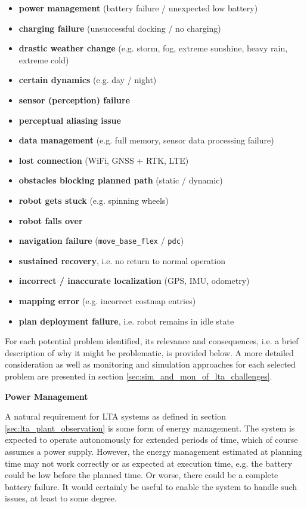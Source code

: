 \documentclass[english, master, utf8]{base/thesis_KBS}
\newcommand{\code}[1]{\colorbox{light-gray}{\texttt{#1}}}
\begin{document}
\begin{itemize}
    \item \textbf{power management} (battery failure / unexpected low battery)
    \item \textbf{charging failure} (unsuccessful docking / no charging)
    \item \textbf{drastic weather change} (e.g. storm, fog, extreme sunshine, heavy rain, extreme cold)
    \item \textbf{certain dynamics} (e.g. day / night)
    \item \textbf{sensor (perception) failure}
    \item \textbf{perceptual aliasing issue}
    \item \textbf{data management} (e.g. full memory, sensor data processing failure)
    \item \textbf{lost connection} (WiFi, GNSS + RTK, LTE)
    \item \textbf{obstacles blocking planned path} (static / dynamic)
    \item \textbf{robot gets stuck} (e.g. spinning wheels)
    \item \textbf{robot falls over}
    \item \textbf{navigation failure} (\code{move\_base\_flex} / \code{pdc})
    \item \textbf{sustained recovery}, i.e. no return to normal operation
    \item \textbf{incorrect / inaccurate localization} (GPS, IMU, odometry)
    \item \textbf{mapping error} (e.g. incorrect costmap entries)
    \item \textbf{plan deployment failure}, i.e. robot remains in idle state
\end{itemize}
For each potential problem identified, its relevance and consequences, i.e. a brief description of why it might be problematic, is provided below.
A more detailed consideration as well as monitoring and simulation approaches for each selected problem are presented in section \ref{sec:sim_and_mon_of_lta_challenges}.\newline

\noindent
\textbf{Power Management}\newline

\noindent
A natural requirement for LTA systems as defined in section \ref{sec:lta_plant_observation} is some form of energy management.
The system is expected to operate autonomously for extended periods of time, which of course assumes a power supply. 
However, the energy management estimated at planning time may not work correctly or as expected at execution time, e.g. the battery could be 
low before the planned time. Or worse, there could be a complete battery failure. It would certainly be useful to enable the system to handle such issues, at least to 
some degree.\newline
\end{document}
